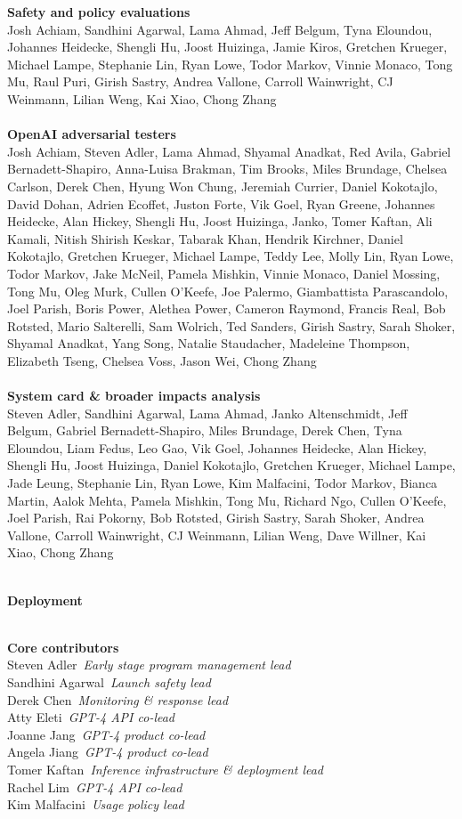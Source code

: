 \documentclass{article}
\newcommand{\creditsectionheader}[1]{\parbox{\columnwidth}{\centering \textbf{\small #1}}\\}
\newcommand{\creditlistheader}[1]{\textbf{#1}\footnotemark[\thefootnote]\\}
\newcommand{\creditlist}[2]{\creditlistheader{#1}#2\\
\\}
\newcommand{\corecontributor}[2]{#1\ \textit{#2}\\}
\begin{document}
\begin{multicols}{2}
\creditlist{Safety and policy evaluations}{Josh Achiam, Sandhini Agarwal, Lama Ahmad, Jeff Belgum, Tyna Eloundou, Johannes Heidecke, Shengli Hu, Joost Huizinga, Jamie Kiros, Gretchen Krueger, Michael Lampe, Stephanie Lin, Ryan Lowe, Todor Markov, Vinnie Monaco, Tong Mu, Raul Puri, Girish Sastry, Andrea Vallone, Carroll Wainwright, CJ Weinmann, Lilian Weng, Kai Xiao, Chong Zhang}
\creditlist{OpenAI adversarial testers}{Josh Achiam, Steven Adler, Lama Ahmad, Shyamal Anadkat, Red Avila, Gabriel Bernadett-Shapiro, Anna-Luisa Brakman, Tim Brooks, Miles Brundage, Chelsea Carlson, Derek Chen, Hyung Won Chung, Jeremiah Currier, Daniel Kokotajlo, David Dohan, Adrien Ecoffet, Juston Forte, Vik Goel, Ryan Greene, Johannes Heidecke, Alan Hickey, Shengli Hu, Joost Huizinga, Janko, Tomer Kaftan, Ali Kamali, Nitish Shirish Keskar, Tabarak Khan, Hendrik Kirchner, Daniel Kokotajlo, Gretchen Krueger, Michael Lampe, Teddy Lee, Molly Lin, Ryan Lowe, Todor Markov, Jake McNeil, Pamela Mishkin, Vinnie Monaco, Daniel Mossing, Tong Mu, Oleg Murk, Cullen O’Keefe, Joe Palermo, Giambattista Parascandolo, Joel Parish, Boris Power, Alethea Power, Cameron Raymond, Francis Real, Bob Rotsted, Mario Salterelli, Sam Wolrich, Ted Sanders, Girish Sastry, Sarah Shoker, Shyamal Anadkat, Yang Song, Natalie Staudacher, Madeleine Thompson, Elizabeth Tseng, Chelsea Voss, Jason Wei, Chong Zhang}
\creditlist{System card \& broader impacts analysis}{Steven Adler, Sandhini Agarwal, Lama Ahmad, Janko Altenschmidt, Jeff Belgum, Gabriel Bernadett-Shapiro, Miles Brundage, Derek Chen, Tyna Eloundou, Liam Fedus, Leo Gao, Vik Goel, Johannes Heidecke, Alan Hickey, Shengli Hu, Joost Huizinga, Daniel Kokotajlo, Gretchen Krueger, Michael Lampe, Jade Leung, Stephanie Lin, Ryan Lowe, Kim Malfacini, Todor Markov, Bianca Martin, Aalok Mehta, Pamela Mishkin, Tong Mu, Richard Ngo, Cullen O’Keefe, Joel Parish, Rai Pokorny, Bob Rotsted, Girish Sastry, Sarah Shoker, Andrea Vallone, Carroll Wainwright, CJ Weinmann, Lilian Weng, Dave Willner, Kai Xiao, Chong Zhang}
\creditsectionheader{Deployment}
\creditlistheader{Core contributors}
\corecontributor{Steven Adler}{Early stage program management lead}
\corecontributor{Sandhini Agarwal}{Launch safety lead}
\corecontributor{Derek Chen}{Monitoring \& response lead}
\corecontributor{Atty Eleti}{GPT-4 API co-lead}
\corecontributor{Joanne Jang}{GPT-4 product co-lead}
\corecontributor{Angela Jiang}{GPT-4 product co-lead}
\corecontributor{Tomer Kaftan}{Inference infrastructure \& deployment lead}
\corecontributor{Rachel Lim}{GPT-4 API co-lead}
\corecontributor{Kim Malfacini}{Usage policy lead}

\end{multicols}
\end{document}
